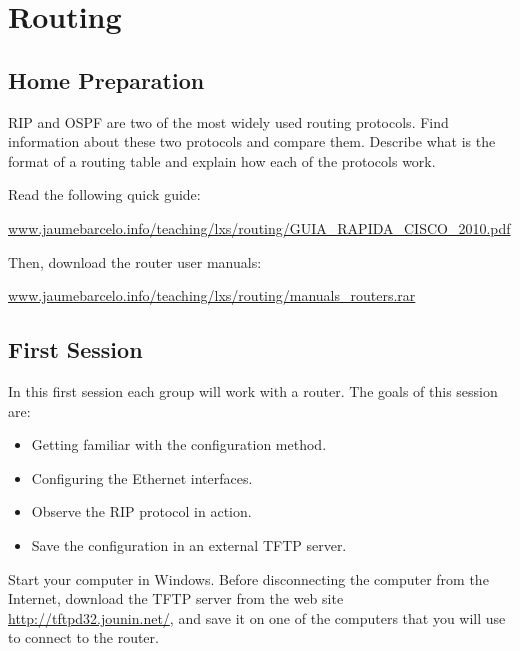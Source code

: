 \chapter{Routing}

\section{Home Preparation}

RIP and OSPF are two of the most widely used routing protocols. Find information about these two protocols and compare them. Describe what is the format of a routing table and explain how each of the protocols work.

Read the following quick guide:

\url{www.jaumebarcelo.info/teaching/lxs/routing/GUIA_RAPIDA_CISCO_2010.pdf}

Then, download the router user manuals:

\url{www.jaumebarcelo.info/teaching/lxs/routing/manuals_routers.rar}

\section{First Session}

In this first session each group will work with a router. The goals of this session are:
\begin{itemize}
\item Getting familiar with the configuration method.
\item Configuring the Ethernet interfaces.
\item Observe the RIP protocol in action.
\item Save the configuration in an external TFTP server.
\end{itemize}

Start your computer in Windows. Before disconnecting the computer from the Internet, download the TFTP server from the web site \url{http://tftpd32.jounin.net/}, and save it on one of the computers that you will use to connect to the router.

